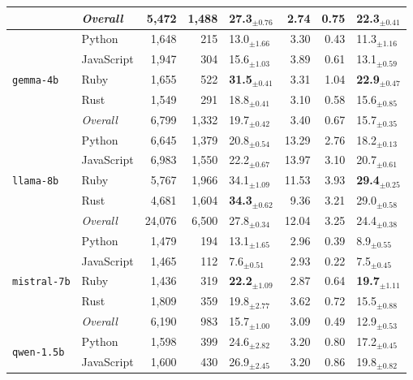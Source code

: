\begin{longtable}{@{}llrrp{0.72cm}rrp{0.72cm}@{}}
      & \textit{Overall} & 5,472 & 1,488 & 27.3$_{\pm 0.76}$ & 2.74 & 0.75 & 22.3$_{\pm 0.41}$ \\
    \midrule
      \multirow{5}{*}{\texttt{gemma-4b}} & Python & 1,648 & 215 & 13.0$_{\pm 1.66}$ & 3.30 & 0.43 & 11.3$_{\pm 1.16}$ \\
       & JavaScript & 1,947 & 304 & 15.6$_{\pm 1.03}$ & 3.89 & 0.61 & 13.1$_{\pm 0.59}$ \\
       & Ruby & 1,655 & 522 & \textbf{31.5$_{\pm 0.41}$} & 3.31 & 1.04 & \textbf{22.9$_{\pm 0.47}$} \\
       & Rust & 1,549 & 291 & 18.8$_{\pm 0.41}$ & 3.10 & 0.58 & 15.6$_{\pm 0.85}$ \\ \cmidrule(lr){2-8}
      & \textit{Overall} & 6,799 & 1,332 & 19.7$_{\pm 0.42}$ & 3.40 & 0.67 & 15.7$_{\pm 0.35}$ \\
    \midrule
      \multirow{5}{*}{\texttt{llama-8b}} & Python & 6,645 & 1,379 & 20.8$_{\pm 0.54}$ & 13.29 & 2.76 & 18.2$_{\pm 0.13}$ \\
       & JavaScript & 6,983 & 1,550 & 22.2$_{\pm 0.67}$ & 13.97 & 3.10 & 20.7$_{\pm 0.61}$ \\
       & Ruby & 5,767 & 1,966 & 34.1$_{\pm 1.09}$ & 11.53 & 3.93 & \textbf{29.4$_{\pm 0.25}$} \\
       & Rust & 4,681 & 1,604 & \textbf{34.3$_{\pm 0.62}$} & 9.36 & 3.21 & 29.0$_{\pm 0.58}$ \\ \cmidrule(lr){2-8}
      & \textit{Overall} & 24,076 & 6,500 & 27.8$_{\pm 0.34}$ & 12.04 & 3.25 & 24.4$_{\pm 0.38}$ \\
    \midrule
      \multirow{5}{*}{\texttt{mistral-7b}} & Python & 1,479 & 194 & 13.1$_{\pm 1.65}$ & 2.96 & 0.39 & 8.9$_{\pm 0.55}$ \\
       & JavaScript & 1,465 & 112 & 7.6$_{\pm 0.51}$ & 2.93 & 0.22 & 7.5$_{\pm 0.45}$ \\
       & Ruby & 1,436 & 319 & \textbf{22.2$_{\pm 1.09}$} & 2.87 & 0.64 & \textbf{19.7$_{\pm 1.11}$} \\
       & Rust & 1,809 & 359 & 19.8$_{\pm 2.77}$ & 3.62 & 0.72 & 15.5$_{\pm 0.88}$ \\ \cmidrule(lr){2-8}
      & \textit{Overall} & 6,190 & 983 & 15.7$_{\pm 1.00}$ & 3.09 & 0.49 & 12.9$_{\pm 0.53}$ \\
    \midrule
      \multirow{5}{*}{\texttt{qwen-1.5b}} & Python & 1,598 & 399 & 24.6$_{\pm 2.82}$ & 3.20 & 0.80 & 17.2$_{\pm 0.45}$ \\
       & JavaScript & 1,600 & 430 & 26.9$_{\pm 2.45}$ & 3.20 & 0.86 & 19.8$_{\pm 0.82}$ \\

\end{longtable}
